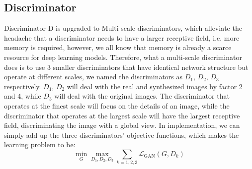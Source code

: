 \subsection{Discriminator}
Discriminator D is upgraded to Multi-scale discriminators, which alleviate the headache that a 
discriminator needs to have a larger receptive field, i.e. more memory is required, however, we 
all know that memory is already a scarce resource for deep learning models. Therefore, what a 
multi-scale discriminator does is to use 3 smaller discriminators that have identical network
structure but operate at different scales, we named the discriminators as $D_{1}$, $D_{2}$, $D_{3}$ 
respectively. $D_{1}$, $D_{2}$ will deal with the real and synthesized images by factor 2 and 4, 
while $D_{3}$ will deal with the original images. The discriminator that operates at the finest 
scale will focus on the details of an image, while the discriminator that operates at the largest 
scale will have the largest receptive field, discriminating the image with a global view. In 
implementation, we can simply add up the three discriminators' objective functions, which makes 
the learning problem to be:
$$\min _{G} \max _{D_{1}, D_{2}, D_{3}} \sum_{k=1,2,3} \mathcal{L}_{\mathrm{GAN}}\left(G, D_{k}\right)$$

